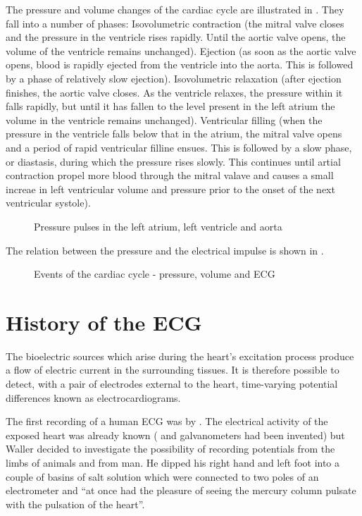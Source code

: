 The pressure and volume changes of the cardiac cycle are illustrated in
.  They fall into a number of phases:
Isovolumetric contraction (the mitral valve closes and the pressure in the
ventricle rises rapidly.  Until the aortic valve opens, the volume of the
ventricle remains unchanged).  
Ejection (as soon as the aortic valve opens, blood is rapidly ejected from the
ventricle into the aorta.  This is followed by a phase of relatively slow ejection).
Isovolumetric relaxation (after ejection finishes, the aortic valve closes.
As the ventricle relaxes, the pressure within it falls rapidly, but until it
has fallen to the level present in the left atrium the volume in the ventricle
remains unchanged).
Ventricular filling (when the pressure in the ventricle falls below that in
the atrium, the mitral valve opens and a period of rapid ventricular filline
ensues.  This is followed by a slow phase, or diastasis, during which the
pressure rises slowly.  This continues until artial contraction propel more
blood through the mitral valave and causes a small increae in left ventricular
volume and pressure prior to the onset of the next ventricular systole).
\begin{figure}[htbp] \centering
  \caption{Pressure pulses in the left atrium, left ventricle and aorta}
  \label{fig:press-vol2}
\end{figure}

The relation between the pressure and the electrical impulse is shown in 
.
\begin{figure}[htbp] \centering
  \caption{Events of the cardiac cycle - pressure, volume and ECG}
  \label{fig:press-vol}
\end{figure}

\section{History of the ECG}
The bioelectric sources which arise during the heart's excitation process
produce a flow of electric current in the surrounding tissues.  It is
therefore possible to detect, with a pair of electrodes external to the heart,
time-varying potential differences known as electrocardiograms.

The first recording of a human ECG was by \citet{waller:1887}. The
electrical activity of the exposed heart was already known ( and galvanometers
had been invented) but Waller decided to investigate the possibility of
recording potentials from the limbs of animals and from man.  He dipped his
right hand and left foot into a couple of basins of salt solution which were
connected to two poles of an electrometer and ``at once had the pleasure of
seeing the mercury column pulsate with the pulsation of the heart''.

